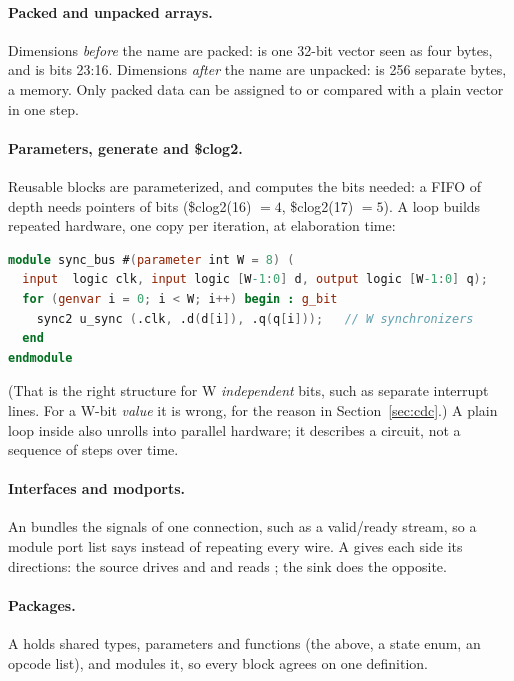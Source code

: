 \paragraph{Packed and unpacked arrays.} Dimensions \emph{before} the name are packed:  is one 32-bit vector seen as four bytes, and  is bits 23:16. Dimensions \emph{after} the name are unpacked:  is 256 separate bytes, a memory. Only packed data can be assigned to or compared with a plain vector in one step.

\paragraph{Parameters, generate and \$clog2.} Reusable blocks are parameterized, and  computes the bits needed: a FIFO of depth  needs pointers of  bits (\$clog2(16) $= 4$, \$clog2(17) $= 5$). A  loop builds repeated hardware, one copy per iteration, at elaboration time:
\begin{lstlisting}[language=Verilog]
module sync_bus #(parameter int W = 8) (
  input  logic clk, input logic [W-1:0] d, output logic [W-1:0] q);
  for (genvar i = 0; i < W; i++) begin : g_bit
    sync2 u_sync (.clk, .d(d[i]), .q(q[i]));   // W synchronizers
  end
endmodule
\end{lstlisting}
(That is the right structure for W \emph{independent} bits, such as separate interrupt lines. For a W-bit \emph{value} it is wrong, for the reason in Section~\ref{sec:cdc}.) A plain  loop inside  also unrolls into parallel hardware; it describes a circuit, not a sequence of steps over time.

\paragraph{Interfaces and modports.} An  bundles the signals of one connection, such as a valid/ready stream, so a module port list says  instead of repeating every wire. A  gives each side its directions: the source drives  and  and reads ; the sink does the opposite.

\paragraph{Packages.} A  holds shared types, parameters and functions (the  above, a state enum, an opcode list), and modules  it, so every block agrees on one definition.

